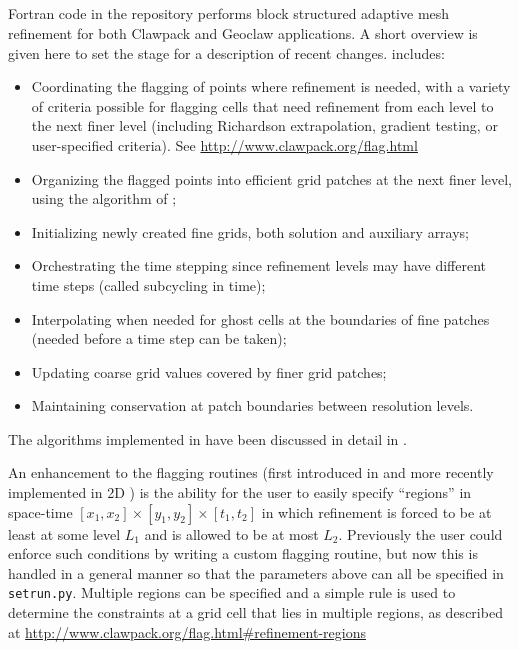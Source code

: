 %
%
%

\subsection{\amrclaw}
Fortran code in the \amrclaw repository performs block structured adaptive mesh
refinement \cite{BO,BC} for both 
Clawpack and Geoclaw  applications.
A short overview is given
here to set the stage for a description of recent changes.
\amrclaw includes: 
\begin{itemize}
\item
Coordinating the flagging of points where refinement is needed,
with a variety of criteria possible for flagging cells that need refinement
from each level to the next finer level (including Richardson extrapolation,
gradient testing, or user-specified criteria).  See
\url{http://www.clawpack.org/flag.html}
\item
Organizing the flagged points into efficient grid
patches at the next finer level, using the algorithm of
\cite{mjb-rig:cluster};
\item
Initializing newly created fine grids, both solution and
auxiliary arrays;
\item
Orchestrating the time stepping since refinement levels may have
different time steps ({called subcycling in time});
\item
Interpolating when needed for ghost cells at the boundaries of fine patches \\
({needed before a time step can be taken});
\item
Updating coarse grid values covered by finer grid patches;
\item
Maintaining conservation at patch boundaries between resolution levels.\\
\end{itemize}

The algorithms implemented in \amrclaw have been discussed in detail in
\cite{mjb-rjl:amrclaw,LeVequeGeorgeBerger:an11}. 

An enhancement to the flagging routines (first introduced in
\geoclaw and more recently implemented in 2D \amrclaw) 
is the ability for the user to easily specify ``regions'' in space-time
$[x_1,x_2] \times [y_1,y_2] \times [t_1,t_2]$ in which refinement is forced to
be at least at some level $L_1$ and is allowed to be at most $L_2$.
Previously the user could enforce such conditions by writing a custom
flagging routine, but now this is handled in a general manner so that the
parameters above can all be specified in \texttt{setrun.py}.  Multiple
regions can be specified and a simple rule is used to determine the
constraints at a grid cell that lies in multiple regions, as described at
\url{http://www.clawpack.org/flag.html#refinement-regions}


